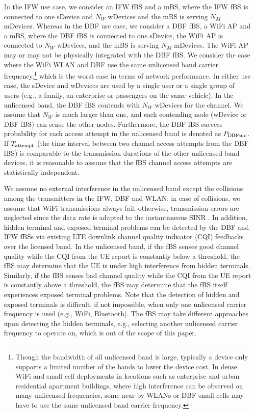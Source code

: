 \documentclass[journal,final,letterpaper,10pt,doublecolumn,twoside]{IEEEtran}
\begin{document}
In the IFW use case, we consider an IFW fBS and a mBS, where the IFW fBS is connected to one sDevice and $N_W$ wDevices and the mBS is serving $N_M$ mDevices. Whereas in the DBF use case, we consider a DBF fBS, a WiFi AP and a mBS, where the DBF fBS is connected to one sDevice, the WiFi AP is connected to $N_W$ wDevices, and the mBS is serving $N_M$ mDevices. The WiFi AP may or may not be physically integrated with the DBF fBS. We consider the case where the WiFi WLAN and DBF use the same unlicensed band carrier frequency,\footnote{Though the bandwidth of all unlicensed band is large, typically a device only supports a limited number of the bands to lower the device cost. In dense WiFi and small cell deployments in locations such as enterprise and urban residential apartment buildings, where high interference can be observed on many unlicensed frequencies, some near-by WLANs or DBF small cells may have to use the same unlicensed band carrier frequency.} which is the worst case in terms of network performance. In either use case, the sDevice and wDevices are used by a single user or a single group of users (e.g., a family, an enterprise or passengers on the same vehicle). In the unlicensed band, the DBF fBS contends with $N_W$ wDevices for the channel. We assume that $N_W$ is much larger than one, and each contending node (wDevice or DBF fBS) can sense the other nodes.  Furthermore, the DBF fBS success probability for each access attempt in the unlicensed band is denoted as $P_{\textmd{DBFsuc}}$. If $T_{\textmd{attempt}}$ (the time interval between two channel access attempts from the DBF fBS) is comparable to the transmission durations of the other unlicensed band devices, it is reasonable to assume that the fBS channel access attempts are statistically independent.

We assume no external interference in the unlicensed band except the collisions among the transmitters in the IFW, DBF and WLAN; in case of collisions, we assume that WiFi transmissions always fail, otherwise, transmission errors are neglected since the data rate is adapted to the instantaneous SINR \cite{802.11-2007}. In addition, hidden terminal and exposed terminal problems can be detected by the DBF and IFW fBSs via existing LTE downlink channel quality indicator (CQI) feedbacks over the licensed band. In the unlicensed band, if the fBS senses good channel quality while the CQI from the UE report is constantly below a threshold, the fBS may determine that the UE is under high interference from hidden terminals. Similarly, if the fBS senses bad channel quality while the CQI from the UE report is constantly above a threshold, the fBS may determine that the fBS itself experiences exposed terminal problems. Note that the detection of hidden and exposed terminals is difficult, if not impossible, when only one unlicensed carrier frequency is used (e.g., WiFi, Bluetooth).
The fBS may take different approaches upon detecting the hidden terminals, e.g., selecting another unlicensed carrier frequency to operate on, which is out of the scope of this paper.
\end{document}
